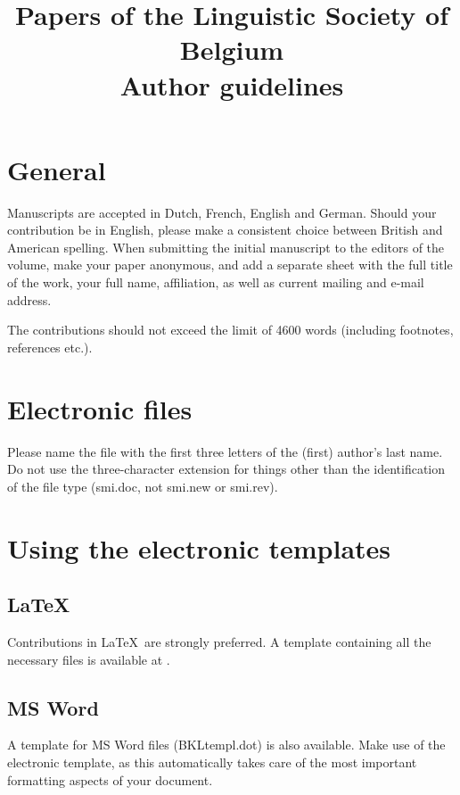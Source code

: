 \documentclass[times,linguex]{lsb}
\title[short title]{Papers of the Linguistic Society of Belgium\\ Author guidelines}
\author[Vanden Wyngaerd]%
{
\spauthor{Guido Vanden Wyngaerd \\ \institute{KU Leuven}} 
}
\begin{document}
\maketitle

\begin{abstract} \normalsize  \lipsum[1]
\end{abstract}

\clearpage

\section{General}

Manuscripts are accepted in Dutch, French, English and German. Should your contribution be in English, please make a consistent choice between British and American spelling. When submitting the initial manuscript to the editors of the volume, make your paper anonymous, and  add a separate sheet with the full title of the work, your full name, affiliation, as well as current mailing and e-mail address.

The contributions should not exceed the limit of 4600 words (including footnotes, references etc.). 

\section{Electronic files}

Please name the file with the first three letters of the (first) author’s last name. Do not use the three-character extension for things other than the identification of the file type (smi.doc, not smi.new or smi.rev). 

\section{Using the electronic templates}

\subsection{\LaTeX\ }
Contributions in \LaTeX\ are strongly preferred. A template containing all the necessary files is available at \url{}. 

\subsection{MS Word}

A template for MS Word files (BKLtempl.dot) is also available. Make use of the electronic template, as this automatically takes care of the most important formatting aspects of your document. 
\end{document}
